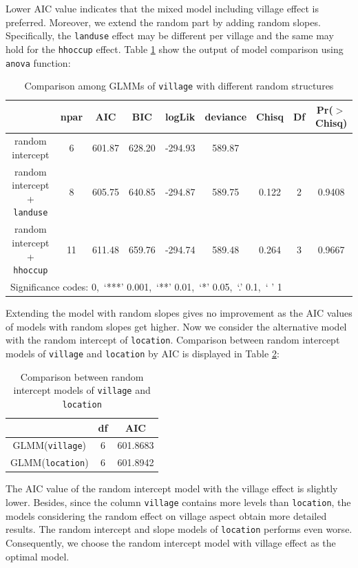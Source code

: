 \documentclass[11pt,twoside]{article}
\numberwithin{Theorem}{section}
\numberwithin{Definition}{section}
\numberwithin{Lemma}{section}
\numberwithin{Algorithm}{section}
\numberwithin{equation}{section}
\begin{document}
Lower AIC value indicates that the mixed model including village effect is preferred. Moreover, we extend the random part by adding random slopes. Specifically, the \texttt{landuse} effect may be different per village and the same may hold for the \texttt{hhoccup} effect. Table \ref{tab:glmm2} show the output of model comparison using \texttt{anova} function:

\begin{table}[!h]
	\centering
	\begin{tabular}{|c|c|c|c|c|c|c|c|c|}
		\hline
		& npar & AIC & BIC & logLik & deviance & Chisq & Df & Pr($>$Chisq) \\  
		\hline
		random intercept & 6 & 601.87 & 628.20 & -294.93 & 589.87 & & & \\                      
		random intercept + \texttt{landuse} & 8 & 605.75 & 640.85 & -294.87 & 589.75 & 0.122 & 2 & 0.9408 \\
		random intercept + \texttt{hhoccup} & 11 & 611.48 & 659.76 & -294.74 & 589.48 & 0.264 & 3 & 0.9667 \\
		\hline
		\multicolumn{9}{|l|}{Significance codes: 0,\ ‘***’ 0.001,\ ‘**’ 0.01,\ ‘*’ 0.05,\ ‘.’ 0.1,\ ‘ ’ 1} \\
		\hline
	\end{tabular}
	\caption{Comparison among GLMMs of \texttt{village} with different random structures}
	\label{tab:glmm2}
\end{table}

Extending the model with random slopes gives no improvement as the AIC values of models with random slopes get higher. Now we consider the alternative model with the random intercept of \texttt{location}. Comparison between random intercept models of \texttt{village} and \texttt{location} by AIC is displayed in Table \ref{tab:glmm3}:

\begin{table}[!h]
	\centering
	\begin{tabular}{|c|c|c|}
		\hline
		& df & AIC  \\  
		\hline
		GLMM(\texttt{village}) & 6 & 601.8683	\\	
		GLMM(\texttt{location}) & 6 & 601.8942 \\
		\hline
	\end{tabular}
	\caption{Comparison between random intercept models of \texttt{village} and \texttt{location}}
	\label{tab:glmm3}
\end{table}

The AIC value of the random intercept model with the village effect is slightly lower. Besides, since the column \texttt{village} contains more levels than \texttt{location}, the models considering the random effect on village aspect obtain more detailed results. The random intercept and slope models of \texttt{location} performs even worse. Consequently, we choose the random intercept model with village effect as the optimal model.
\end{document}
